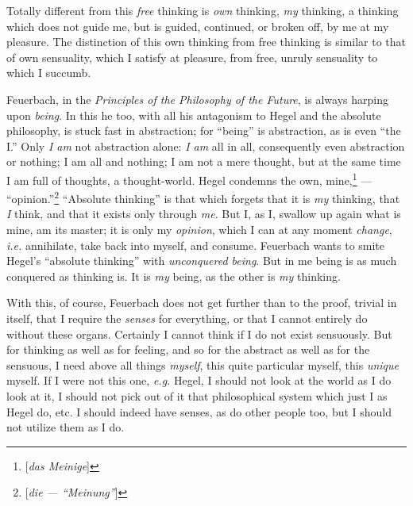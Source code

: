 Totally different from this \textit{free} thinking is \textit{own} thinking, 
\textit{my} thinking, a thinking which does not guide me, but is guided, 
continued, or broken off, by me at my pleasure. The distinction of this own 
thinking from free thinking is similar to that of own sensuality, which I 
satisfy at pleasure, from free, unruly sensuality to which I succumb.

Feuerbach, in the \textit{Principles of the Philosophy of the Future}, is 
always harping upon \textit{being}. In this he too, with all his antagonism to 
Hegel and the absolute philosophy, is stuck fast in abstraction; for 
``being'' is abstraction, as is even ``the I.'' Only \textit{I am} not 
abstraction alone: \textit{I am} all in all, consequently even abstraction or 
nothing; I am all and nothing; I am not a mere thought, but at the same time I 
am full of thoughts, a thought-world. Hegel condemns the own, 
mine,\footnote{[\textit{das Meinige}]} --- ``opinion.''\footnote{[\textit{die --- ``Meinung''}]} ``Absolute thinking'' is that which forgets that it is 
\textit{my} thinking, that \textit{I} think, and that it exists only through 
\textit{me}. But I, as I, swallow up again what is mine, am its master; it is 
only my \textit{opinion}, which I can at any moment \textit{change}, 
\textit{i.e.} annihilate, take back into myself, and consume. Feuerbach wants 
to smite Hegel's ``absolute thinking'' with \textit{unconquered being}. But 
in me being is as much conquered as thinking is. It is \textit{my} being, as 
the other is \textit{my} thinking.

With this, of course, Feuerbach does not get further than to the proof, 
trivial in itself, that I require the \textit{senses} for everything, or that 
I cannot entirely do without these organs. Certainly I cannot think if I do 
not exist sensuously. But for thinking as well as for feeling, and so for the 
abstract as well as for the sensuous, I need above all things \textit{myself}, 
this quite particular myself, this \textit{unique} myself. If I were not this 
one, \textit{e.g.} Hegel, I should not look at the world as I do look at it, 
I should not pick out of it that philosophical system which just I as Hegel 
do, etc. I should indeed have senses, as do other people too, but I should not 
utilize them as I do.

